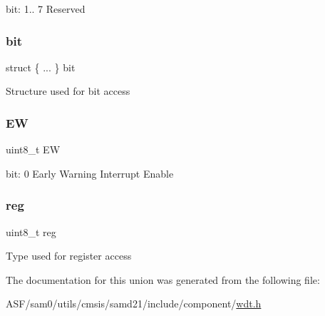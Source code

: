 bit\+: 1.. 7 Reserved \mbox{\label{union_w_d_t___i_n_t_e_n_c_l_r___type_a1f260a989c893f1e2fafc3e4807b5978}} 
\subsubsection{\texorpdfstring{bit}{bit}}
{\footnotesize\ttfamily struct \{ ... \}   bit}

Structure used for bit access \mbox{\label{union_w_d_t___i_n_t_e_n_c_l_r___type_a187628158e640ab75b63af25c00d9ba7}} 
\subsubsection{\texorpdfstring{EW}{EW}}
{\footnotesize\ttfamily uint8\+\_\+t EW}

bit\+: 0 Early Warning Interrupt Enable \mbox{\label{union_w_d_t___i_n_t_e_n_c_l_r___type_a9428adc9af4653a2050e2536b55dec8d}} 
\subsubsection{\texorpdfstring{reg}{reg}}
{\footnotesize\ttfamily uint8\+\_\+t reg}

Type used for register access 

The documentation for this union was generated from the following file\+:\begin{DoxyCompactItemize}
\item 
A\+S\+F/sam0/utils/cmsis/samd21/include/component/\mbox{\hyperlink{component_2wdt_8h}{wdt.\+h}}\end{DoxyCompactItemize}
